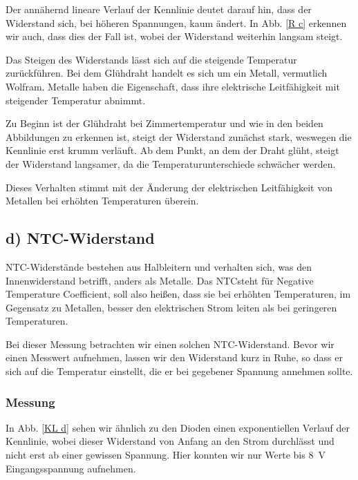 \documentclass[11pt,a4paper,titlepage, ngerman]{article}
\begin{document}
				Der annähernd lineare Verlauf der Kennlinie deutet darauf hin, dass der Widerstand sich, bei höheren Spannungen, kaum ändert. In Abb. \ref{R c} erkennen wir auch, dass dies der Fall ist, wobei der Widerstand weiterhin langsam steigt.
				
				Das Steigen des Widerstands lässt sich auf die steigende Temperatur zurückführen. Bei dem Glühdraht handelt es sich um ein Metall, vermutlich Wolfram. Metalle haben die Eigenschaft, dass ihre elektrische Leitfähigkeit mit steigender Temperatur abnimmt.
				
				Zu Beginn ist der Glühdraht bei Zimmertemperatur und wie in den beiden Abbildungen zu erkennen ist, steigt der Widerstand zunächst stark, weswegen die Kennlinie erst krumm verläuft. Ab dem Punkt, an dem der Draht glüht, steigt der Widerstand langsamer, da die Temperaturunterschiede schwächer werden.
				
				Dieses Verhalten stimmt mit der Änderung der elektrischen Leitfähigkeit von Metallen bei erhöhten Temperaturen überein.
				
		\subsection{d) NTC-Widerstand} 
			
			NTC-Widerstände bestehen aus Halbleitern und verhalten sich, was den Innenwiderstand betrifft, anders als Metalle. Das \glqq NTC\grqq  steht für \glqq Negative Temperature Coefficient\grqq , soll also heißen, dass sie bei erhöhten Temperaturen, im Gegensatz zu Metallen, besser den elektrischen Strom leiten als bei geringeren Temperaturen.
			
			Bei dieser Messung betrachten wir einen solchen NTC-Widerstand. Bevor wir einen Messwert aufnehmen, lassen wir den Widerstand kurz in Ruhe, so dass er sich auf die Temperatur einstellt, die er bei gegebener Spannung annehmen sollte. 
			
			\subsubsection{Messung}
			
				In Abb. \ref{KL d} sehen wir ähnlich zu den Dioden einen exponentiellen Verlauf der Kennlinie, wobei dieser Widerstand von Anfang an den Strom durchlässt und nicht erst ab einer gewissen Spannung.
				Hier konnten wir nur Werte bis \SI{8}{\V} Eingangsspannung aufnehmen.
				
\end{document}
